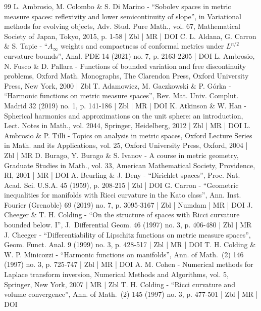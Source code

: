 \begin{thebibliography}{99}
L. Ambrosio, M. Colombo \& S. Di Marino - “Sobolev spaces in metric measure spaces: reflexivity and lower semicontinuity of slope”, in Variational methods for evolving objects, Adv. Stud. Pure Math., vol. 67, Mathematical Society of Japan, Tokyo, 2015, p. 1-58 | Zbl | MR | DOI
C. L. Aldana, G. Carron \& S. Tapie - “$A_\infty $ weights and compactness of conformal metrics under $L^{n/2}$ curvature bounds”, Anal. PDE 14 (2021) no. 7, p. 2163-2205 | DOI
L. Ambrosio, N. Fusco \& D. Pallara - Functions of bounded variation and free discontinuity problems, Oxford Math. Monographs, The Clarendon Press, Oxford University Press, New York, 2000 | Zbl
T. Adamowicz, M. Gaczkowski \& P. Górka - “Harmonic functions on metric measure spaces”, Rev. Mat. Univ. Complut. Madrid 32 (2019) no. 1, p. 141-186 | Zbl | MR | DOI
K. Atkinson \& W. Han - Spherical harmonics and approximations on the unit sphere: an introduction, Lect. Notes in Math., vol. 2044, Springer, Heidelberg, 2012 | Zbl | MR | DOI
L. Ambrosio \& P. Tilli - Topics on analysis in metric spaces, Oxford Lecture Series in Math. and its Applications, vol. 25, Oxford University Press, Oxford, 2004 | Zbl | MR
D. Burago, Y. Burago \& S. Ivanov - A course in metric geometry, Graduate Studies in Math., vol. 33, American Mathematical Society, Providence, RI, 2001 | MR | DOI
A. Beurling \& J. Deny - “Dirichlet spaces”, Proc. Nat. Acad. Sci. U.S.A. 45 (1959), p. 208-215 | Zbl | DOI
G. Carron - “Geometric inequalities for manifolds with Ricci curvature in the Kato class”, Ann. Inst. Fourier (Grenoble) 69 (2019) no. 7, p. 3095-3167 | Zbl | Numdam | MR | DOI
J. Cheeger \& T. H. Colding - “On the structure of spaces with Ricci curvature bounded below. I”, J. Differential Geom. 46 (1997) no. 3, p. 406-480 | Zbl | MR
J. Cheeger - “Differentiability of Lipschitz functions on metric measure spaces”, Geom. Funct. Anal. 9 (1999) no. 3, p. 428-517 | Zbl | MR | DOI
T. H. Colding \& W. P. Minicozzi - “Harmonic functions on manifolds”, Ann. of Math. (2) 146 (1997) no. 3, p. 725-747 | Zbl | MR | DOI
A. M. Cohen - Numerical methods for Laplace transform inversion, Numerical Methods and Algorithms, vol. 5, Springer, New York, 2007 | MR | Zbl
T. H. Colding - “Ricci curvature and volume convergence”, Ann. of Math. (2) 145 (1997) no. 3, p. 477-501 | Zbl | MR | DOI

\end{thebibliography}
